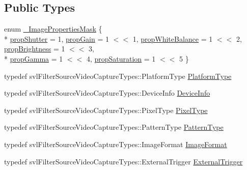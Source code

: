 \subsection*{Public Types}
\begin{DoxyCompactItemize}
\item 
enum \hyperlink{classsvl_filter_source_video_capture_a479413536f6b6d984c08c44b0cbd64f2}{\+\_\+\+Image\+Properties\+Mask} \{ \\*
\hyperlink{classsvl_filter_source_video_capture_a479413536f6b6d984c08c44b0cbd64f2a4d4abed08ff5a841c3cad808d18d88d1}{prop\+Shutter} = 1, 
\hyperlink{classsvl_filter_source_video_capture_a479413536f6b6d984c08c44b0cbd64f2a88da91bf4ae85481673925943068bc37}{prop\+Gain} = 1 $<$$<$ 1, 
\hyperlink{classsvl_filter_source_video_capture_a479413536f6b6d984c08c44b0cbd64f2aede12f2f91b1e017e4027f350ea8035b}{prop\+White\+Balance} = 1 $<$$<$ 2, 
\hyperlink{classsvl_filter_source_video_capture_a479413536f6b6d984c08c44b0cbd64f2ac3c2d9c1e70cc5b6bc1c76ed483cd7a0}{prop\+Brightness} = 1 $<$$<$ 3, 
\\*
\hyperlink{classsvl_filter_source_video_capture_a479413536f6b6d984c08c44b0cbd64f2a5084b58f2483c79dc12662bc03696ddf}{prop\+Gamma} = 1 $<$$<$ 4, 
\hyperlink{classsvl_filter_source_video_capture_a479413536f6b6d984c08c44b0cbd64f2afe5986680c0c4853df93e46902891b37}{prop\+Saturation} = 1 $<$$<$ 5
 \}
\item 
typedef svl\+Filter\+Source\+Video\+Capture\+Types\+::\+Platform\+Type \hyperlink{classsvl_filter_source_video_capture_a75f10dbd026c0ae70007a18758895ea0}{Platform\+Type}
\item 
typedef svl\+Filter\+Source\+Video\+Capture\+Types\+::\+Device\+Info \hyperlink{classsvl_filter_source_video_capture_ad656487fb2deec890dc39764152b8f8b}{Device\+Info}
\item 
typedef svl\+Filter\+Source\+Video\+Capture\+Types\+::\+Pixel\+Type \hyperlink{classsvl_filter_source_video_capture_a0d92a26e94ffd48535df5ab2ff330c90}{Pixel\+Type}
\item 
typedef svl\+Filter\+Source\+Video\+Capture\+Types\+::\+Pattern\+Type \hyperlink{classsvl_filter_source_video_capture_a374a69b1d506cf982ba5ce45d5f84776}{Pattern\+Type}
\item 
typedef svl\+Filter\+Source\+Video\+Capture\+Types\+::\+Image\+Format \hyperlink{classsvl_filter_source_video_capture_a0944cc8abe4240701683128c28fa5349}{Image\+Format}
\item 
typedef svl\+Filter\+Source\+Video\+Capture\+Types\+::\+External\+Trigger \hyperlink{classsvl_filter_source_video_capture_a609a8eb75ea23b7b35068207cc3c3144}{External\+Trigger}
$$
\end{DoxyCompactItemize}
